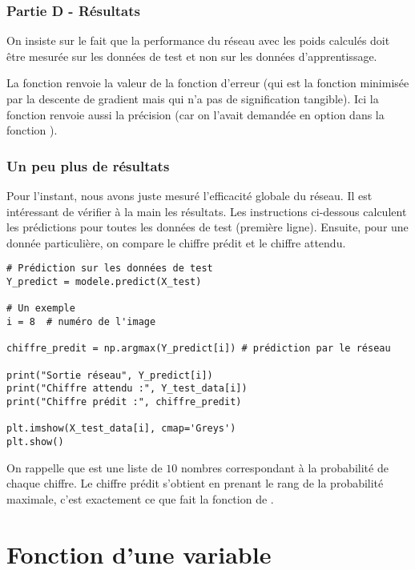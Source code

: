 \documentclass[11pt,class=report,crop=false]{standalone}
\begin{document}
\subsubsection*{Partie D - Résultats}

On insiste sur le fait que la performance du réseau avec les poids calculés doit être mesurée sur les données de test et non sur les données d'apprentissage.

La fonction  renvoie la valeur de la fonction d'erreur (qui est la fonction minimisée par la descente de gradient mais qui n'a pas de signification tangible). Ici la fonction renvoie aussi la précision (car on l'avait demandée en option dans la fonction ).


\subsubsection*{Un peu plus de résultats}

Pour l'instant, nous avons juste mesuré l'efficacité globale du réseau. Il est intéressant  de vérifier à la main les résultats. Les instructions ci-dessous
calculent les prédictions pour toutes les données de test (première ligne). Ensuite, pour une donnée particulière, on compare le chiffre prédit et le chiffre attendu.


\begin{lstlisting}
# Prédiction sur les données de test
Y_predict = modele.predict(X_test)

# Un exemple
i = 8  # numéro de l'image 

chiffre_predit = np.argmax(Y_predict[i]) # prédiction par le réseau

print("Sortie réseau", Y_predict[i])
print("Chiffre attendu :", Y_test_data[i])
print("Chiffre prédit :", chiffre_predit)

plt.imshow(X_test_data[i], cmap='Greys')  
plt.show()
\end{lstlisting} 

On rappelle que  est une liste de $10$ nombres correspondant à la probabilité de chaque chiffre. Le chiffre prédit s'obtient en prenant le rang de la probabilité maximale, c'est exactement ce que fait la fonction  de \numpy{}.



\section{Fonction d'une variable}
\end{document}
